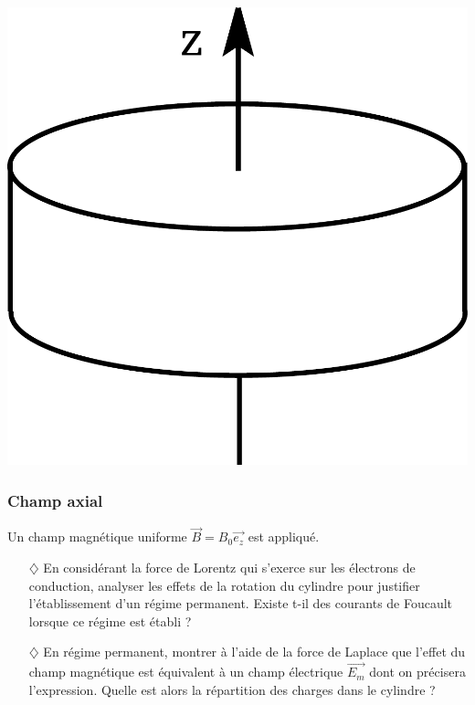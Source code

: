\documentclass{report}
\begin{document}
\begin{center}
	\includegraphics[scale=0.2]{Foucault.pdf}
\end{center}

\subsubsection*{Champ axial}

	Un champ magnétique uniforme $\vec{B}=B_{0}\vec{e_{z}}$ est appliqué.
	
	\begin{itemize}
	
		\item[$\diamondsuit$] En considérant la force de Lorentz qui s'exerce sur les électrons de conduction, analyser les effets de la rotation du cylindre pour justifier l'établissement d'un régime permanent. Existe t-il des courants de Foucault lorsque ce régime est établi ? 
		
	\item[$\diamondsuit$] En régime permanent, montrer à l'aide de la force de Laplace que l'effet du champ magnétique est équivalent à un champ électrique $\vec{E_m}$ dont on précisera l'expression. Quelle est alors la répartition des charges dans le cylindre ?
	
	\end{itemize}
	
\end{document}
